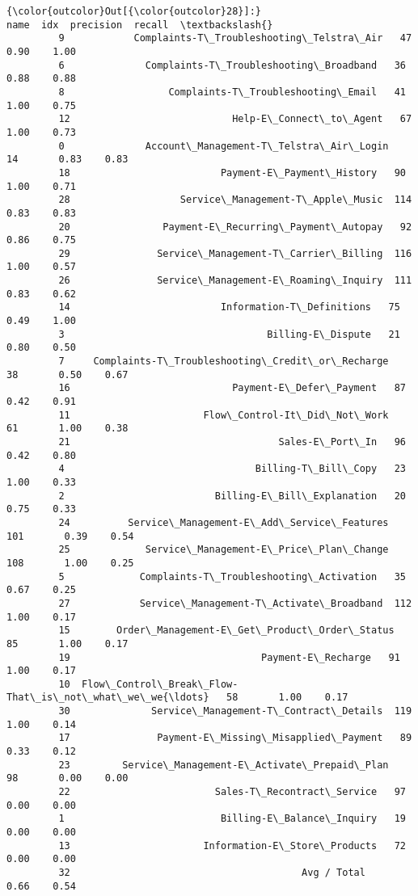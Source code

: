 \documentclass[11pt]{article}
\begin{document}
\begin{Verbatim}[commandchars=\\\{\}]
{\color{outcolor}Out[{\color{outcolor}28}]:}                                                  name  idx  precision  recall  \textbackslash{}
         9            Complaints-T\_Troubleshooting\_Telstra\_Air   47       0.90    1.00   
         6              Complaints-T\_Troubleshooting\_Broadband   36       0.88    0.88   
         8                  Complaints-T\_Troubleshooting\_Email   41       1.00    0.75   
         12                            Help-E\_Connect\_to\_Agent   67       1.00    0.73   
         0              Account\_Management-T\_Telstra\_Air\_Login   14       0.83    0.83   
         18                          Payment-E\_Payment\_History   90       1.00    0.71   
         28                   Service\_Management-T\_Apple\_Music  114       0.83    0.83   
         20                Payment-E\_Recurring\_Payment\_Autopay   92       0.86    0.75   
         29               Service\_Management-T\_Carrier\_Billing  116       1.00    0.57   
         26               Service\_Management-E\_Roaming\_Inquiry  111       0.83    0.62   
         14                          Information-T\_Definitions   75       0.49    1.00   
         3                                   Billing-E\_Dispute   21       0.80    0.50   
         7     Complaints-T\_Troubleshooting\_Credit\_or\_Recharge   38       0.50    0.67   
         16                            Payment-E\_Defer\_Payment   87       0.42    0.91   
         11                       Flow\_Control-It\_Did\_Not\_Work   61       1.00    0.38   
         21                                    Sales-E\_Port\_In   96       0.42    0.80   
         4                                 Billing-T\_Bill\_Copy   23       1.00    0.33   
         2                          Billing-E\_Bill\_Explanation   20       0.75    0.33   
         24          Service\_Management-E\_Add\_Service\_Features  101       0.39    0.54   
         25             Service\_Management-E\_Price\_Plan\_Change  108       1.00    0.25   
         5             Complaints-T\_Troubleshooting\_Activation   35       0.67    0.25   
         27            Service\_Management-T\_Activate\_Broadband  112       1.00    0.17   
         15        Order\_Management-E\_Get\_Product\_Order\_Status   85       1.00    0.17   
         19                                 Payment-E\_Recharge   91       1.00    0.17   
         10  Flow\_Control\_Break\_Flow-That\_is\_not\_what\_we\_we{\ldots}   58       1.00    0.17   
         30              Service\_Management-T\_Contract\_Details  119       1.00    0.14   
         17               Payment-E\_Missing\_Misapplied\_Payment   89       0.33    0.12   
         23         Service\_Management-E\_Activate\_Prepaid\_Plan   98       0.00    0.00   
         22                         Sales-T\_Recontract\_Service   97       0.00    0.00   
         1                           Billing-E\_Balance\_Inquiry   19       0.00    0.00   
         13                       Information-E\_Store\_Products   72       0.00    0.00   
         32                                        Avg / Total            0.66    0.54   
         

\end{Verbatim}
\end{document}
